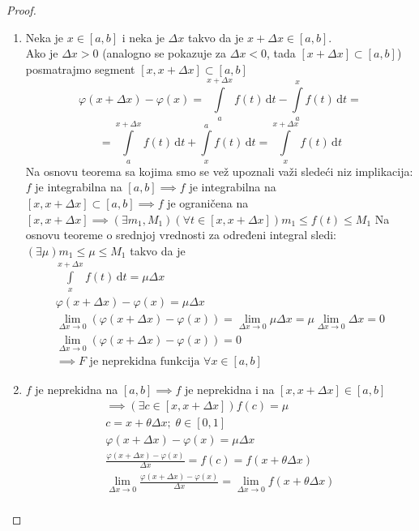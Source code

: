 \begin{proof}
	\begin{enumerate}[label = \arabic*)]
		\item
			Neka je $x\in [a,b]$ i neka je $\Delta x$ takvo da je $x+\Delta x \in [a,b]$.\\
			Ako je $\Delta x > 0$ (analogno se pokazuje za $\Delta x <0$, tada $[x+\Delta x] \subset [a,b]$) posmatrajmo segment $[x,x+\Delta x]\subset [a,b]$
			$$\varphi(x+\Delta x) - \varphi(x) = \int \limits^{x+\Delta x}_a f(t) \, \mathrm{d}t - \int \limits^x_a f(t) \, \mathrm{d}t=$$
			$$= \int \limits^{x+\Delta x}_a f(t) \, \mathrm{d}t + \int \limits^a_x f(t) \, \mathrm{d}t=\int \limits^{x+\Delta x}_x f(t) \, \mathrm{d}t$$
			Na osnovu teorema sa kojima smo se vež upoznali važi sledeći niz implikacija:\\
			$f$ je integrabilna na $[a,b] \implies f$ je integrabilna na $[x,x+\Delta x]\subset[a,b] \implies f$ je ograničena na $[x,x+\Delta x] \implies (\exists m_1, M_1)(\forall t \in [x, x+\Delta x]) m_1\leq f(t) \leq M_1$ Na osnovu teoreme o srednjoj vrednosti za određeni integral sledi: $(\exists \mu) m_1\leq \mu \leq M_1$ takvo da je 
			\begin{gather*}
				\int \limits^{x+\Delta x}_x f(t) \, \mathrm{d}t = \mu \Delta x\\
				\varphi(x+\Delta x)- \varphi(x) = \mu \Delta x\\
				 \lim_{\Delta x \to 0} (\varphi(x+\Delta x)-\varphi(x)) = \lim_{\Delta x \to 0} \mu \Delta x = \mu \lim_{\Delta x \to 0}\Delta x = 0\\
				\lim_{\Delta x \to 0} (\varphi(x+\Delta x)-\varphi(x)) = 0\\
				\implies F \text{ je neprekidna funkcija } \forall x \in [a,b]
			\end{gather*}		
		\item 
			$f$ je neprekidna na $[a,b] \implies f$ je neprekidna i na $[x, x+\Delta x] \in [a,b]$
			\begin{gather*}
				\implies ( \exists c \in [x, x+ \Delta x]) f(c) = \mu \\
				c = x+\theta \Delta x; \; \theta \in [0,1]\\
				\varphi(x+\Delta x)-\varphi(x) = \mu \Delta x\\
				\frac{\varphi(x+\Delta x)-\varphi(x)}{\Delta x} = f(c) = f(x+ \theta \Delta x)\\
				\lim_{\Delta x \to 0}	\frac{\varphi(x+\Delta x)-\varphi(x)}{\Delta x} = \lim_{\Delta x \to 0} f(x+ \theta \Delta x)\\

\end{gather*}
\end{enumerate}
\end{proof}
